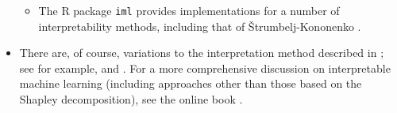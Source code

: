 \begin{itemize}
\begin{itemize}
	\item
		The {\color{red}R package} 
		\texttt{iml} \cite{Molnar2018} %
		provides implementations for a number of interpretability methods,
		including that of \v{S}trumbelj-Kononenko \cite{Strumbelj2010}.

	\end{itemize}

\item
	There are, of course, variations to the interpretation method described in \cite{Strumbelj2010};
	see for example, \cite{Lipovestsky2001} and \cite{Lundberg2017}. 
	For a more comprehensive discussion on interpretable machine learning
	(including approaches other than those based on the Shapley decomposition),
	see the {\color{red}online book} \cite{Molnar2019}.

\end{itemize}



\renewcommand{\theenumi}{\roman{enumi}}
\renewcommand{\labelenumi}{\textnormal{(\theenumi)}$\;\;$}

